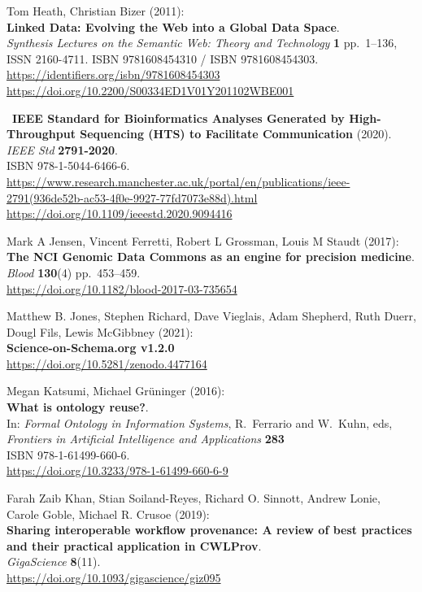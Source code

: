 \begin{thebibliography}{9}
Tom Heath, Christian Bizer (2011):\\
\textbf{Linked Data: Evolving the Web into a Global Data Space}.\\
\emph{Synthesis Lectures on the Semantic Web: Theory and Technology}
\textbf{1} pp.~1--136, ISSN 2160-4711. ISBN 9781608454310 / ISBN
9781608454303. \url{https://identifiers.org/isbn/9781608454303}\\
\url{https://doi.org/10.2200/S00334ED1V01Y201102WBE001}

~\textbf{IEEE Standard for Bioinformatics Analyses Generated by
High-Throughput Sequencing (HTS) to Facilitate Communication} (2020).\\
\emph{IEEE Std} \textbf{2791-2020}.\\
ISBN 978-1-5044-6466-6.\\
\url{https://www.research.manchester.ac.uk/portal/en/publications/ieee-2791(936de52b-ac53-4f0e-9927-77fd7073e88d).html}\\
\url{https://doi.org/10.1109/ieeestd.2020.9094416}

Mark A Jensen, Vincent Ferretti, Robert L Grossman, Louis M
Staudt (2017):\\
\textbf{The NCI Genomic Data Commons as an engine for precision
medicine}.\\
\emph{Blood} \textbf{130}(4) pp.~453--459.\\
\url{https://doi.org/10.1182/blood-2017-03-735654}

Matthew B. Jones, Stephen Richard, Dave Vieglais, Adam
Shepherd, Ruth Duerr, Dougl Fils, Lewis McGibbney (2021):\\
\textbf{Science-on-Schema.org v1.2.0}\\
\url{https://doi.org/10.5281/zenodo.4477164}

Megan Katsumi, Michael Grüninger (2016):\\
\textbf{What is ontology reuse?}.\\
In: \emph{Formal Ontology in Information Systems}, R.~Ferrario and
W.~Kuhn, eds,\\
\emph{Frontiers in Artificial Intelligence and Applications}
\textbf{283}\\
ISBN 978-1-61499-660-6.\\
\url{https://doi.org/10.3233/978-1-61499-660-6-9}

Farah Zaib Khan, Stian Soiland-Reyes, Richard O. Sinnott,
Andrew Lonie, Carole Goble, Michael R. Crusoe (2019):\\
\textbf{Sharing interoperable workflow provenance: A review of best
practices and their practical application in CWLProv}.\\
\emph{GigaScience} \textbf{8}(11).\\
\url{https://doi.org/10.1093/gigascience/giz095}


\end{thebibliography}
